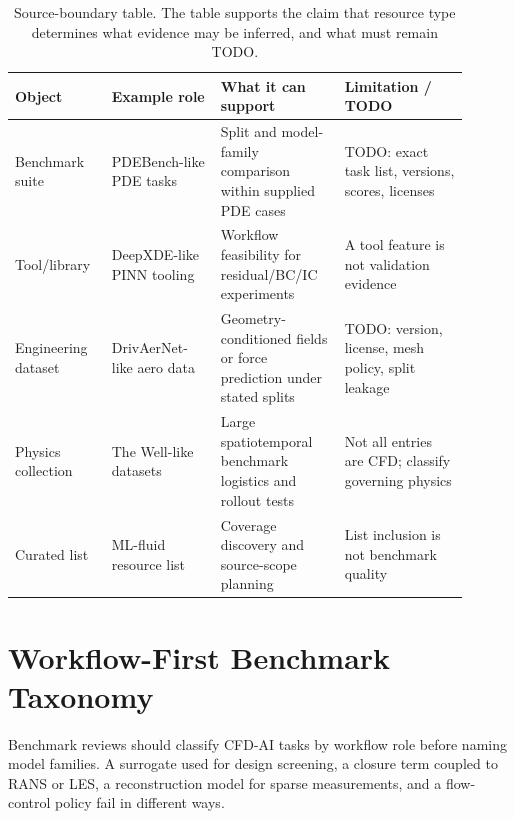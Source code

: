 \documentclass[11pt]{article}
\begin{document}
\begin{table}[h]
\centering
\small
\begin{tabular}{p{0.18\linewidth}p{0.22\linewidth}p{0.25\linewidth}p{0.25\linewidth}}
\toprule
Object & Example role & What it can support & Limitation / TODO \\
\midrule
Benchmark suite & PDEBench-like PDE tasks & Split and model-family comparison within supplied PDE cases & TODO: exact task list, versions, scores, licenses \\
Tool/library & DeepXDE-like PINN tooling & Workflow feasibility for residual/BC/IC experiments & A tool feature is not validation evidence \\
Engineering dataset & DrivAerNet-like aero data & Geometry-conditioned fields or force prediction under stated splits & TODO: version, license, mesh policy, split leakage \\
Physics collection & The Well-like datasets & Large spatiotemporal benchmark logistics and rollout tests & Not all entries are CFD; classify governing physics \\
Curated list & ML-fluid resource list & Coverage discovery and source-scope planning & List inclusion is not benchmark quality \\
\bottomrule
\end{tabular}
\caption{Source-boundary table. The table supports the claim that resource type determines what evidence may be inferred, and what must remain TODO.}
\end{table}

\section{Workflow-First Benchmark Taxonomy}
Benchmark reviews should classify CFD-AI tasks by workflow role before naming model families. A surrogate used for design screening, a closure term coupled to RANS or LES, a reconstruction model for sparse measurements, and a flow-control policy fail in different ways.
\end{document}
